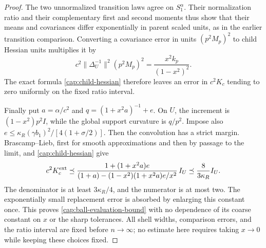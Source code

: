 \begin{proof}
The two unnormalized transition laws agree on \(S_1^\alpha\). Their
normalization ratio and their complementary first and second moments thus
show that their means and covariances differ exponentially in parent scaled
units, as in the earlier transition comparison. Converting a covariance
error in units \((p^2M_p)^2\) to child Hessian units multiplies it by
\[
 c^2\|\Delta_U^{-1}\|^2(p^2M_p)^2
       =\frac{x^2k_p}{(1-x^2)^2}.
\]
The exact formula \eqref{cap:child-hessian} therefore leaves an error in
\(c^2K_c\) tending to zero uniformly on the fixed ratio interval.

Finally put \(a=\alpha/c^2\) and
\(q=(1+x^2a)^{-1}+e\). On \(U\), the increment is
\((1-x^2)p^2I\), while the global support curvature is \(q/p^2\).
Impose also
\(e\le\kappa_R(\gamma b_1)^2/[4(1+\sigma/2)]\).
Then the convolution has a strict margin. Brascamp--Lieb, first for smooth
approximations and then by passage to the limit, and
\eqref{cap:child-hessian} give
\[
 c^2K_c^{\rm ext}
 \preceq
 \frac{1+(1+x^2a)e}
      {(1+a)-(1-x^2)(1+x^2a)e/x^2}\,I_U
 \preceq \frac{8}{3\kappa_R}I_U.
\]
The denominator is at least \(3\kappa_R/4\), and the numerator is at
most two. The exponentially small replacement error is absorbed by
enlarging this constant once. This proves \eqref{cap:ball-evaluation-bound}
with no dependence of its coarse constant on \(x\) or the sharp
tolerances. All shell widths, comparison errors, and the ratio interval are
fixed before \(n\to\infty\); no estimate here requires taking
\(x\to0\) while keeping these choices fixed.
\end{proof}
